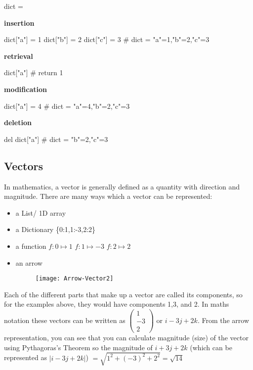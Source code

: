  \begin{python}
 dict = {}
 \end{python}

  \textbf{insertion}

\begin{python}
dict["a"] = 1
dict["b"] = 2
dict["c"] = 3
# dict = {"a"=1,"b"=2,"c"=3}
\end{python}

  \textbf{retrieval}

\begin{python}
dict["a"]
# return 1
\end{python}

  \textbf{modification}

\begin{python}
dict["a"] = 4
# dict = {"a"=4,"b"=2,"c"=3}
\end{python}

  \textbf{deletion}

\begin{python}
del dict["a"]
# dict = {"b"=2,"c"=3}
\end{python}


\subsection{Vectors}

  In mathematics, a vector is generally defined as a quantity with direction and magnitude. There are many ways which a vector can be represented:
  \begin{itemize}
  	\item a List/ 1D array
	  	\subitem [1,-3,2]
  	\item a Dictionary
	  	\subitem \{0:1,1:-3,2:2\}
  	\item a function
	  	\subitem $f:0\mapsto1$
	  	\subitem $f:1\mapsto-3$
	  	\subitem $f:2\mapsto2$
  	\item an arrow
	  	\begin{figure}[H]
		  	\texttt{[image: Arrow-Vector2]}
	  	\end{figure}
  \end{itemize}
  Each of the different parts that make up a vector are called its components, so for the examples above, they would have components 1,3, and 2. In maths notation these vectors can be written as $ \left( \begin{smallmatrix} 1 \\ -3 \\ 2\end{smallmatrix}\right)  $ or $i - 3j + 2k$. From the arrow representation, you can see that you can calculate magnitude (size) of the vector using Pythagoras's Theorem so the magnitude of $i + 3j + 2k$ (which can be represented as $|i - 3j + 2k|$) $ = \sqrt{1^2+(-3)^2+2^2} = \sqrt{14}$

